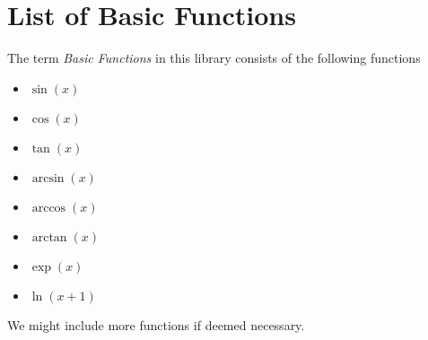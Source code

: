 \documentclass[12pt]{article}
\begin{document}
\section{List of Basic Functions}\label{Appendix:BasicFunctions}
The term \emph{Basic Functions} in this library consists of the following functions
\begin{itemize}
	\item $\sin(x)$
	\item $\cos(x)$
	\item $\tan(x)$
	\item $\arcsin(x)$
	\item $\arccos(x)$
	\item $\arctan(x)$
	\item $\exp(x)$
	\item $\ln(x+1)$
\end{itemize}
We might include more functions if deemed necessary.
\end{document}
